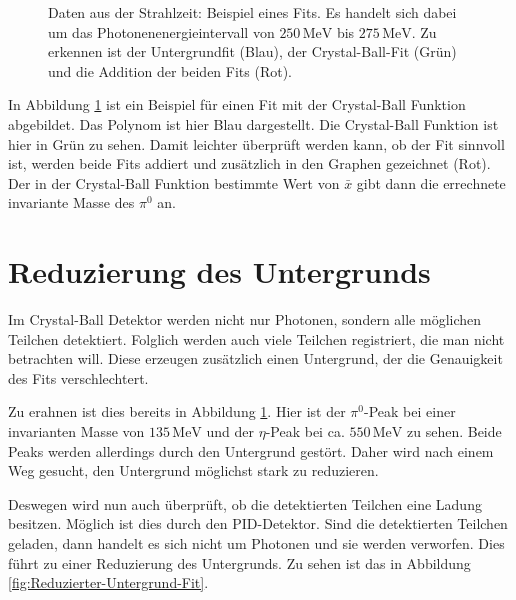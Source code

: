 \documentclass[a4paper,11pt,oneside,final,german,openbib,pdftex]{scrbook}
\begin{document}
{\begin{figure}[h!]
\begin{center}
		\caption[Strahlzeit: Beispielfit f\"ur die Crystal-Ball-Fitfunktion]{Daten aus der Strahlzeit: Beispiel eines Fits. Es handelt sich dabei um das Photonenenergieintervall von $250 \,\text{MeV}$ bis $275\,\text{MeV}$.
			Zu erkennen ist der Untergrundfit (Blau), der Crystal-Ball-Fit (Gr\"un) und die Addition der beiden Fits (Rot). %
		}
		\label{fig:fitexampleenergyinterval0903}	
	\end{center}
\end{figure}

In Abbildung \ref{fig:fitexampleenergyinterval0903} ist ein Beispiel f\"ur einen Fit mit der Crystal-Ball Funktion abgebildet. Das Polynom ist hier Blau dargestellt. Die Crystal-Ball Funktion ist hier in Gr\"un zu sehen. Damit leichter \"uberpr\"uft werden kann, ob der Fit sinnvoll ist, werden beide Fits addiert und zus\"atzlich in den Graphen gezeichnet (Rot). Der in der Crystal-Ball Funktion bestimmte Wert von $\bar{x}$ gibt dann die errechnete invariante Masse des $\pi^0$ an.


\section{Reduzierung des Untergrunds}

Im Crystal-Ball Detektor werden nicht nur Photonen, sondern alle m\"oglichen Teilchen detektiert. Folglich werden auch viele Teilchen registriert, die man nicht betrachten will. Diese erzeugen zus\"atzlich einen Untergrund, der die Genauigkeit des Fits verschlechtert.

Zu erahnen ist dies bereits in Abbildung \ref{fig:fitexampleenergyinterval0903}. Hier ist der $\pi^0$-Peak bei einer invarianten Masse von $135\,\text{MeV}$ und der $\eta$-Peak bei ca. $550\,\text{MeV}$ zu sehen. Beide Peaks werden allerdings durch den Untergrund gest\"ort. %
 Daher wird nach einem Weg gesucht, den Untergrund m\"oglichst stark zu reduzieren. 

Deswegen wird nun auch \"uberpr\"uft, ob die detektierten Teilchen eine Ladung besitzen. M\"oglich ist dies durch den PID-Detektor. Sind die detektierten Teilchen geladen, dann handelt es sich nicht um Photonen und sie werden verworfen. Dies f\"uhrt zu einer Reduzierung des Untergrunds. Zu sehen ist das in Abbildung \ref{fig:Reduzierter-Untergrund-Fit}.


}
\end{document}
